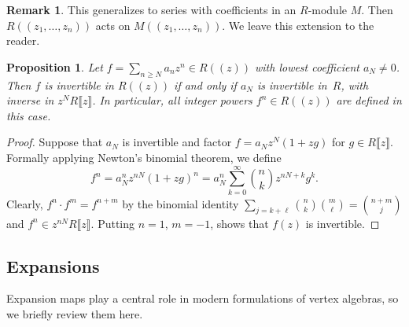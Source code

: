 \documentclass[10pt,a4paper]{amsart}
\numberwithin{equation}{section}
\newtheorem{Proposition}[Theorem]{Proposition}
\theoremstyle{definition}
\newtheorem{Remark}[Theorem]{Remark}
\def\lb{\llbracket}
\def\rb{\rrbracket}
\begin{document}
\begin{Remark}
This generalizes to series with coefficients in an $R$-module $M$. Then $R(\!( z_1,\dots, z_n)\!)$ acts on $M(\!( z_1,\dots, z_n)\!)$. We leave this extension to the reader.
\end{Remark}

\begin{Proposition}
\label{Laurent-invbar}
 Let $f=\sum_{n\geqslant N} a_nz^n\in R(\!( z)\!) $ with lowest coefficient $a_N\neq0$. Then $f$ is invertible in $R(\!( z)\!) $ if and only if $a_N$ is invertible in~$R$, with inverse in $z^N R\lb z\rb$. In particular, all integer powers $f^n\in R(\!( z)\!) $ are defined in this case.
\end{Proposition}

\begin{proof}
 Suppose that $a_N$ is invertible and factor $f=a_Nz^N(1+zg)$ for $g\in R\lb z\rb$. Formally applying Newton's binomial theorem, we define
 \begin{equation}
 \label{eqn:newton-inverse}
 f^n=a_N^nz^{nN}(1+zg)^n=a_N^n\sum_{k=0}^\infty\binom{n}{k}z^{nN+k} g^k.
 \end{equation}
 Clearly, $f^n\cdot f^m = f^{n+m}$ by the binomial identity $\sum_{j=k+\ell}\binom{n}{k}\binom{m}{\ell}=\binom{n+m}{j}$ and $f^n\in z^{nN}R\lb z\rb$. Putting $n=1$, $m=-1$, shows that $f(z)$ is invertible.
\end{proof}

\subsection{Expansions}
\label{s32}

Expansion maps play a central role in modern formulations of vertex algebras, so we briefly review them here.
\end{document}
